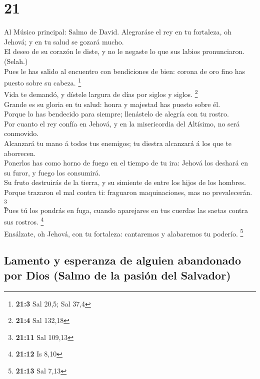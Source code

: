\hypertarget{section-20}{%
\section{21}\label{section-20}}

 Al Músico principal: Salmo de David. Alegraráse el rey en
tu fortaleza, oh Jehová; y en tu salud se gozará mucho.\\
 El deseo de su corazón le diste, y no le negaste lo que
sus labios pronunciaron. (Selah.)\\
 Pues le has salido al encuentro con bendiciones de bien:
corona de oro fino has puesto sobre su cabeza. \footnote{\textbf{21:3}
  Sal 20,5; Sal 37,4}\\
 Vida te demandó, y dístele largura de días por siglos y
siglos. \footnote{\textbf{21:4} Sal 132,18}\\
 Grande es su gloria en tu salud: honra y majestad has
puesto sobre él.\\
 Porque lo has bendecido para siempre; llenástelo de
alegría con tu rostro.\\
 Por cuanto el rey confía en Jehová, y en la misericordia
del Altísimo, no será conmovido.\\
 Alcanzará tu mano á todos tus enemigos; tu diestra
alcanzará á los que te aborrecen.\\
 Ponerlos has como horno de fuego en el tiempo de tu ira:
Jehová los deshará en su furor, y fuego los consumirá.\\
 Su fruto destruirás de la tierra, y su simiente de entre
los hijos de los hombres.\\
 Porque trazaron el mal contra ti: fraguaron
maquinaciones, mas no prevalecerán. \footnote{\textbf{21:11} Sal 109,13}\\
 Pues tú los pondrás en fuga, cuando aparejares en tus
cuerdas las saetas contra sus rostros. \footnote{\textbf{21:12} Is 8,10}\\
 Ensálzate, oh Jehová, con tu fortaleza: cantaremos y
alabaremos tu poderío. \footnote{\textbf{21:13} Sal 7,13}

\hypertarget{lamento-y-esperanza-de-alguien-abandonado-por-dios-salmo-de-la-pasiuxf3n-del-salvador}{%
\subsection{Lamento y esperanza de alguien abandonado por Dios (Salmo de
la pasión del
Salvador)}\label{lamento-y-esperanza-de-alguien-abandonado-por-dios-salmo-de-la-pasiuxf3n-del-salvador}}

